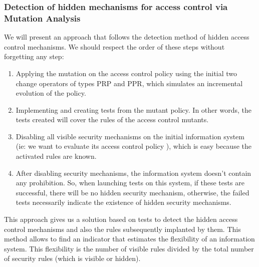 \documentclass{acm_proc_article-sp}
\begin{document}
\subsubsection{Detection of hidden mechanisms for access control via Mutation Analysis}
We will present an approach that follows the detection method of hidden access control mechanisms. We should respect the order of these steps without forgetting any step:
\begin{enumerate}
 \item Applying the mutation on the access control policy using the initial two change operators of types PRP and PPR, which simulates an incremental evolution of the policy.
 \item Implementing and creating tests from the mutant policy. In other words, the tests created will cover the rules of the access control mutants.
 \item Disabling all visible security mechanisms on the initial information system (ie: we want to evaluate its access control policy ), which is easy because the activated rules are known.
 \item After disabling security mechanisms, the information system doesn't contain any prohibition. So, when launching tests on this system, if these tests are successful, there will be no hidden security mechanism, otherwise, the failed tests necessarily indicate the existence of hidden security mechanisms.
\end{enumerate}
This approach gives us a solution based on tests to detect the hidden access control mechanisms and also the rules subsequently implanted by them. This method allows to find an indicator that estimates the flexibility of an information system. This flexibility is the number of visible rules divided by the total number of security rules (which is visible or hidden).
\end{document}

